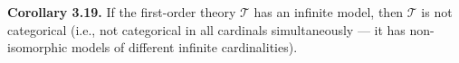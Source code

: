 \textbf{Corollary 3.19.} If the first-order theory $\mathcal{T}$ has an infinite model, then $\mathcal{T}$ is not categorical (i.e., not categorical in all cardinals simultaneously — it has non-isomorphic models of different infinite cardinalities).
